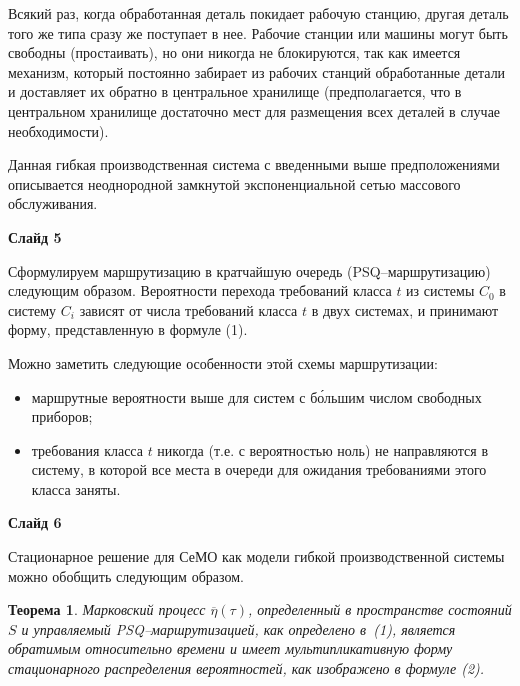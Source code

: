 \documentclass[a4paper,14pt]{extarticle}
\theoremstyle{note}
\newtheorem{theorem}{Теорема}
\begin{document}
Всякий раз, когда обработанная деталь покидает рабочую станцию, другая деталь того же типа сразу же поступает в нее. Рабочие станции или машины могут быть свободны (простаивать), но они никогда не блокируются, так как имеется механизм, который постоянно забирает из рабочих станций обработанные детали и доставляет их обратно в центральное хранилище (предполагается, что в центральном хранилище достаточно мест для размещения всех деталей в случае необходимости).

Данная гибкая производственная система с введенными выше предположениями описывается неоднородной замкнутой экспоненциальной сетью массового обслуживания.


\textbf{Слайд 5}

Сформулируем маршрутизацию в кратчайшую очередь (PSQ--маршрутизацию) следующим образом. Вероятности перехода требований класса $t$ из системы $C_0$ в систему $C_i$ зависят от числа требований класса $t$ в двух системах, и принимают форму, представленную в формуле (1).

Можно заметить следующие особенности этой схемы маршрутизации:
\begin{itemize}
\item маршрутные вероятности выше для систем с б\'{о}льшим числом свободных приборов;
\item требования класса $t$ никогда (т.е. с вероятностью ноль) не направляются в систему, в которой все места в очереди для ожидания требованиями этого класса заняты.
\end{itemize}


\textbf{Слайд 6}

Стационарное решение для СеМО как модели гибкой производственной системы можно обобщить следующим образом.

\begin{theorem}
Марковский процесс $\overline{\eta}(\tau)$, определенный в пространстве состояний $S$ и управляемый PSQ--маршрутизацией, как определено в~(1), является обратимым относительно времени и имеет мультипликативную форму стационарного распределения вероятностей, как изображено в формуле (2).
\end{theorem}





\end{document}
